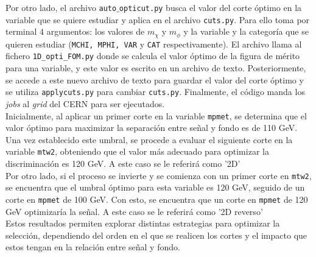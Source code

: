 Por otro lado, el archivo \texttt{auto$\_$opticut.py} busca el valor del corte óptimo en la variable que se quiere estudiar y aplica en el archivo \texttt{cuts.py}. Para ello toma por terminal 4 argumentos: los valores de $m_\chi$ y $m_\phi$ y la variable y la categoría que se quieren estudiar (\texttt{MCHI, MPHI, VAR} y \texttt{CAT} respectivamente). El archivo llama al fichero \texttt{1D\_opti\_FOM.py} donde se calcula el valor óptimo de la figura de mérito para una variable, y este valor es escrito en un archivo de texto. Posteriormente, se accede a este nuevo archivo de texto para guardar el valor del corte óptimo y se utiliza \texttt{applycuts.py} para cambiar \texttt{cuts.py}. Finalmente, el código manda los \textit{jobs} al \textit{grid} del CERN para ser ejecutados. \\

Inicialmente, al aplicar un primer corte en la variable \texttt{mpmet}, se determina que el valor óptimo para maximizar la separación entre señal y fondo es de 110 GeV. Una vez establecido este umbral, se procede a evaluar el siguiente corte en la variable \texttt{mtw2}, obteniendo que el valor más adecuado para optimizar la discriminación es 120 GeV. A este caso se le referirá como '2D'\\ 

Por otro lado, si el proceso se invierte y se comienza con un primer corte en \texttt{mtw2}, se encuentra que el umbral óptimo para esta variable es 120 GeV, seguido de un corte en \texttt{mpmet} de 100 GeV. Con esto, se encuentra que un corte en \texttt{mpmet} de 120 GeV optimizaría la señal. A este caso se le referirá como '2D reverso' \\

Estos resultados permiten explorar distintas estrategias para optimizar la selección, dependiendo del orden en el que se realicen los cortes y el impacto que estos tengan en la relación entre señal y fondo.\\ \newpage


